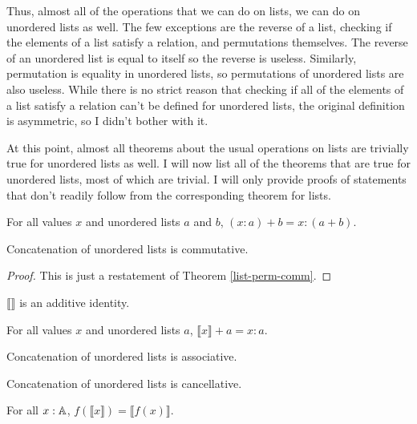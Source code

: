 \documentclass[../math.tex]{subfiles}
\begin{document}
Thus, almost all of the operations that we can do on lists, we can do on
unordered lists as well.  The few exceptions are the reverse of a list, checking
if the elements of a list satisfy a relation, and permutations themselves.  The
reverse of an unordered list is equal to itself so the reverse is useless.
Similarly, permutation is equality in unordered lists, so permutations of
unordered lists are also useless.  While there is no strict reason that checking
if all of the elements of a list satisfy a relation can't be defined for
unordered lists, the original definition is asymmetric, so I didn't bother with
it.

At this point, almost all theorems about the usual operations on lists are
trivially true for unordered lists as well.  I will now list all of the theorems
that are true for unordered lists, most of which are trivial.  I will only
provide proofs of statements that don't readily follow from the corresponding
theorem for lists.

\begin{theorem} \label{ulist-conc-add}
    For all values $x$ and unordered lists $a$ and $b$, $(x : a) + b = x : (a +
    b)$.
\end{theorem}

\begin{instance}
    Concatenation of unordered lists is commutative.
\end{instance}
\begin{proof}
    This is just a restatement of Theorem \ref{list-perm-comm}.
\end{proof}

\begin{instance}
    $\llbracket \rrbracket$ is an additive identity.
\end{instance}

\begin{theorem} \label{ulist-conc-single}
    For all values $x$ and unordered lists $a$, $\llbracket x \rrbracket + a = x
    : a$.
\end{theorem}

\begin{instance}
    Concatenation of unordered lists is associative.
\end{instance}

\begin{instance}
    Concatenation of unordered lists is cancellative.
\end{instance}

\begin{theorem}
    For all $x : \mathbb{A}$, $f(\llbracket x\rrbracket) = \llbracket f(x)\rrbracket$.
\end{theorem}
\end{document}
